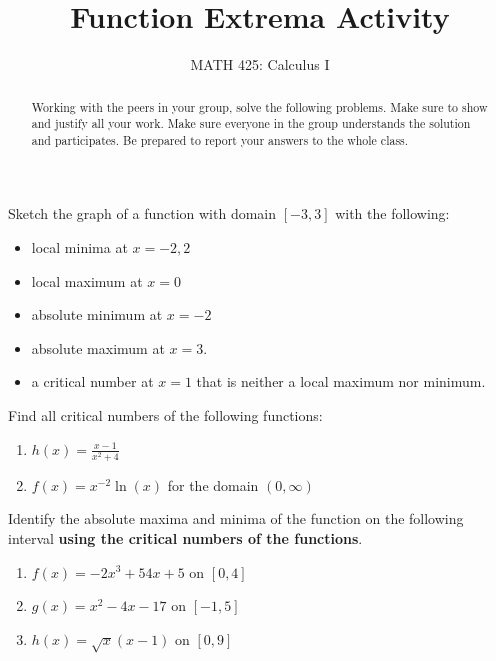 \documentclass{ximera}
\title{Function Extrema Activity}
\author{MATH 425: Calculus I}
\begin{document}
\begin{abstract}
   Working with the peers in your group, solve the following problems. Make sure to show and justify all your work. Make sure everyone in the group understands the solution and participates. Be prepared to report your answers to the whole class. 
\end{abstract}
\maketitle


\begin{exercise}
    Sketch the graph of a function with domain $[-3,3]$ with the following: 
    \begin{itemize}
        \item local minima at $x=-2, 2$
        \item local maximum at $x=0$
        \item absolute minimum at $x=-2$
        \item absolute maximum at $x=3$.
        \item a critical number at $x=1$ that is neither a local maximum nor minimum.
    \end{itemize}
\end{exercise}

\begin{exercise}
    Find all critical numbers of the following functions: 
    \begin{enumerate}
        
        \item $h(x)=\frac{x-1}{x^2+4}$\\
        
        \item $f(x)=x^{-2}\ln(x)$ for the domain $(0,\infty)$\\        
    \end{enumerate}
\end{exercise}

\begin{exercise}
    Identify the absolute maxima and minima of the function on the following interval \textbf{using the critical numbers of the functions}.
    \begin{enumerate}
        \item $f(x)=-2x^3+54x+5$ on $[0,4]$\\
        
        \item $g(x)=x^2-4x-17$ on $[-1,5]$\\
        
        \item $h(x)=\sqrt{x}(x-1)$ on $[0,9]$

    \end{enumerate}
\end{exercise}
\end{document}
